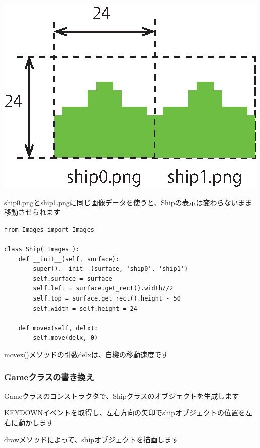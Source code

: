 \documentclass[uplatex,a4paper,11pt,oneside,openany]{jsbook}
\begin{document}
\begin{center}
  \includegraphics[width=0.3\hsize]{figures/eps/ship0.eps}
\end{center}

ship0.pngとship1.pngに同じ画像データを使うと、Shipの表示は変わらないまま移動させられます

\begin{lstlisting}[caption=Class Ship,label=p004]
from Images import Images

class Ship( Images ):
    def __init__(self, surface):
        super().__init__(surface, 'ship0', 'ship1')
        self.surface = surface
        self.left = surface.get_rect().width//2
        self.top = surface.get_rect().height - 50
        self.width = self.height = 24

    def movex(self, delx):
        self.move(delx, 0)
\end{lstlisting}

movex()メソッドの引数delxは、自機の移動速度です

\subsubsection{Gameクラスの書き換え}

Gameクラスのコンストラクタで、Shipクラスのオブジェクトを生成します

KEYDOWNイベントを取得し、左右方向の矢印でshipオブジェクトの位置を左右に動かします

drawメソッドによって、shipオブジェクトを描画します
\end{document}
